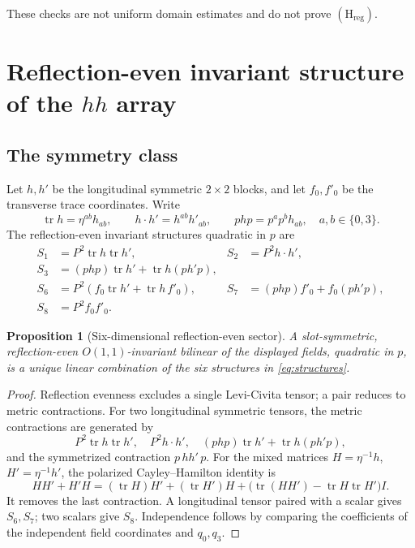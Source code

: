 \documentclass[11pt,a4paper]{article}
\newcommand{\Hreg}{(\mathrm H_{\mathrm{reg}})}
\theoremstyle{plain}
\newtheorem{proposition}[theorem]{Proposition}
\theoremstyle{definition}
\theoremstyle{remark}
\numberwithin{equation}{section}
\begin{document}
These checks are not uniform domain estimates and do not prove
\(\Hreg\).

\section{Reflection-even invariant structure of the \(hh\) array}
\label{sec:structures}

\subsection{The symmetry class}

Let \(h,h'\) be the longitudinal symmetric \(2\times2\) blocks,
and let \(f_0,f'_0\) be the transverse trace coordinates.
Write
\[
 \operatorname{tr}h=\eta^{ab}h_{ab},\qquad
 h\cdot h'=h^{ab}h'_{ab},\qquad
 php=p^ap^bh_{ab},
 \quad a,b\in\{0,3\}.
\]
The reflection-even invariant structures quadratic in \(p\) are
\begin{align}
 S_1&=P^2\operatorname{tr}h\operatorname{tr}h',&
 S_2&=P^2h\cdot h',\nonumber\\
 S_3&=(php)\operatorname{tr}h'
             +\operatorname{tr}h(ph'p),\nonumber\\
 S_6&=P^2(f_0\operatorname{tr}h'
             +\operatorname{tr}h\,f'_0),&
 S_7&=(php)f'_0+f_0(ph'p),\nonumber\\
 S_8&=P^2f_0f'_0.
 \label{eq:structures}
\end{align}

\begin{proposition}[Six-dimensional reflection-even sector]
\label{prop:six}
A slot-symmetric, reflection-even \(O(1,1)\)-invariant bilinear
of the displayed fields, quadratic in \(p\), is a unique linear
combination of the six structures in \eqref{eq:structures}.
\end{proposition}

\begin{proof}
Reflection evenness excludes a single Levi-Civita tensor; a pair
reduces to metric contractions. For two longitudinal symmetric
tensors, the metric contractions are generated by
\[
 P^2\operatorname{tr}h\operatorname{tr}h',\quad
 P^2h\cdot h',\quad
 (php)\operatorname{tr}h'
       +\operatorname{tr}h(ph'p),
\]
and the symmetrized contraction \(p\,hh'\,p\).
For the mixed matrices \(H=\eta^{-1}h\), \(H'=\eta^{-1}h'\),
the polarized Cayley--Hamilton identity is
\[
 HH'+H'H
 =(\operatorname{tr}H)H'
  +(\operatorname{tr}H')H
  +\bigl(\operatorname{tr}(HH')
          -\operatorname{tr}H\operatorname{tr}H'\bigr)I.
\]
It removes the last contraction.
A longitudinal tensor paired with a scalar gives \(S_6,S_7\);
two scalars give \(S_8\).
Independence follows by comparing the coefficients of the
independent field coordinates and \(q_0,q_3\).
\end{proof}
\end{document}

